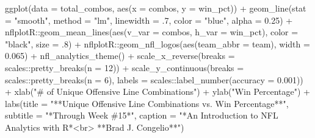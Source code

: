 \documentclass[
  letterpaper,
]{krantz}
\newenvironment{Shaded}{\begin{snugshade}}{\end{snugshade}}
\newcommand{\AttributeTok}[1]{\textcolor[rgb]{0.40,0.45,0.13}{#1}}
\newcommand{\DecValTok}[1]{\textcolor[rgb]{0.68,0.00,0.00}{#1}}
\newcommand{\FloatTok}[1]{\textcolor[rgb]{0.68,0.00,0.00}{#1}}
\newcommand{\FunctionTok}[1]{\textcolor[rgb]{0.28,0.35,0.67}{#1}}
\newcommand{\NormalTok}[1]{\textcolor[rgb]{0.00,0.23,0.31}{#1}}
\newcommand{\SpecialCharTok}[1]{\textcolor[rgb]{0.37,0.37,0.37}{#1}}
\newcommand{\StringTok}[1]{\textcolor[rgb]{0.13,0.47,0.30}{#1}}
\begin{document}
\begin{Shaded}
\begin{Highlighting}[]
\FunctionTok{ggplot}\NormalTok{(}\AttributeTok{data =}\NormalTok{ total\_combos, }\FunctionTok{aes}\NormalTok{(}\AttributeTok{x =}\NormalTok{ combos, }\AttributeTok{y =}\NormalTok{ win\_pct)) }\SpecialCharTok{+}
  \FunctionTok{geom\_line}\NormalTok{(}\AttributeTok{stat =} \StringTok{"smooth"}\NormalTok{, }\AttributeTok{method =} \StringTok{"lm"}\NormalTok{,}
            \AttributeTok{linewidth =}\NormalTok{ .}\DecValTok{7}\NormalTok{, }\AttributeTok{color =} \StringTok{"blue"}\NormalTok{,}
            \AttributeTok{alpha =} \FloatTok{0.25}\NormalTok{) }\SpecialCharTok{+}
\NormalTok{  nflplotR}\SpecialCharTok{::}\FunctionTok{geom\_mean\_lines}\NormalTok{(}\FunctionTok{aes}\NormalTok{(}\AttributeTok{v\_var =}\NormalTok{ combos, }\AttributeTok{h\_var =}\NormalTok{ win\_pct),}
                            \AttributeTok{color =} \StringTok{"black"}\NormalTok{, }\AttributeTok{size =}\NormalTok{ .}\DecValTok{8}\NormalTok{) }\SpecialCharTok{+}
\NormalTok{  nflplotR}\SpecialCharTok{::}\FunctionTok{geom\_nfl\_logos}\NormalTok{(}\FunctionTok{aes}\NormalTok{(}\AttributeTok{team\_abbr =}\NormalTok{ team), }\AttributeTok{width =} \FloatTok{0.065}\NormalTok{) }\SpecialCharTok{+}
  \FunctionTok{nfl\_analytics\_theme}\NormalTok{() }\SpecialCharTok{+}
  \FunctionTok{scale\_x\_reverse}\NormalTok{(}\AttributeTok{breaks =}\NormalTok{ scales}\SpecialCharTok{::}\FunctionTok{pretty\_breaks}\NormalTok{(}\AttributeTok{n =} \DecValTok{12}\NormalTok{)) }\SpecialCharTok{+}
  \FunctionTok{scale\_y\_continuous}\NormalTok{(}\AttributeTok{breaks =}\NormalTok{ scales}\SpecialCharTok{::}\FunctionTok{pretty\_breaks}\NormalTok{(}\AttributeTok{n =} \DecValTok{6}\NormalTok{),}
                     \AttributeTok{labels =}\NormalTok{ scales}\SpecialCharTok{::}\FunctionTok{label\_number}\NormalTok{(}\AttributeTok{accuracy =} \FloatTok{0.001}\NormalTok{)) }\SpecialCharTok{+}
  \FunctionTok{xlab}\NormalTok{(}\StringTok{"\# of Unique Offensive Line Combinations"}\NormalTok{) }\SpecialCharTok{+}
  \FunctionTok{ylab}\NormalTok{(}\StringTok{"Win Percentage"}\NormalTok{) }\SpecialCharTok{+}
  \FunctionTok{labs}\NormalTok{(}\AttributeTok{title =} \StringTok{"**Unique Offensive Line Combinations vs. Win Percentage**"}\NormalTok{,}
       \AttributeTok{subtitle =} \StringTok{"*Through Week \#15*"}\NormalTok{,}
       \AttributeTok{caption =} \StringTok{"*An Introduction to NFL Analytics with R*\textless{}br\textgreater{}}
\StringTok{       **Brad J. Congelio**"}\NormalTok{)}
\end{Highlighting}
\end{Shaded}
\end{document}
